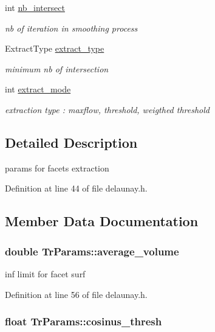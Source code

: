 \begin{DoxyCompactItemize}
int \hyperlink{classTrParams_a6de5f7c969a55b7c9301177c2e38537d}{nb\_\-intersect}
\begin{DoxyCompactList}\small\item\em nb of iteration in smoothing process \item\end{DoxyCompactList}\item 
ExtractType \hyperlink{classTrParams_a98a3411069cffa301444b893523d9c5c}{extract\_\-type}
\begin{DoxyCompactList}\small\item\em minimum nb of intersection \item\end{DoxyCompactList}\item 
int \hyperlink{classTrParams_acf38c074b1af80dba366076f73d22f29}{extract\_\-mode}
\begin{DoxyCompactList}\small\item\em extraction type : maxflow, threshold, weigthed threshold \item\end{DoxyCompactList}\end{DoxyCompactItemize}


\subsection{Detailed Description}
params for facets extraction 

Definition at line 44 of file delaunay.h.



\subsection{Member Data Documentation}
\hypertarget{classTrParams_a2e9a95d7e585f11e9574ad6b4863ed79}{
\subsubsection[{average\_\-volume}]{\setlength{\rightskip}{0pt plus 5cm}double {\bf TrParams::average\_\-volume}}}
\label{classTrParams_a2e9a95d7e585f11e9574ad6b4863ed79}


inf limit for facet surf 



Definition at line 56 of file delaunay.h.

\hypertarget{classTrParams_a91f70ade0efc499e3d55bfb2143d35c6}{
\subsubsection[{cosinus\_\-thresh}]{\setlength{\rightskip}{0pt plus 5cm}float {\bf TrParams::cosinus\_\-thresh}}}
\label{classTrParams_a91f70ade0efc499e3d55bfb2143d35c6}


